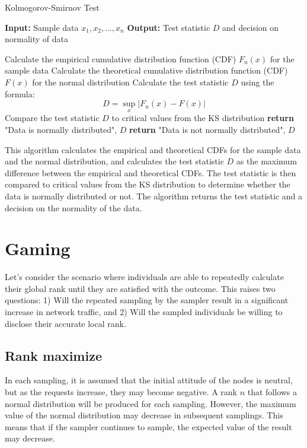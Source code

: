 \documentclass[twocolumn]{article}
\begin{document}
\begin{algorithm}[htbp]
\caption{Kolmogorov-Smirnov Test}
\begin{algorithmic}[1]
\State \textbf{Input:} Sample data $x_1, x_2, \dots, x_n$
\State \textbf{Output:} Test statistic $D$ and decision on normality of data

\State Calculate the empirical cumulative distribution function (CDF) $F_{n}(x)$ for the sample data
\State Calculate the theoretical cumulative distribution function (CDF) $F(x)$ for the normal distribution
\State Calculate the test statistic $D$ using the formula:
\begin{equation}
D = \sup_{x} \left| F_{n}(x) - F(x) \right|
\end{equation}
\State Compare the test statistic $D$ to critical values from the KS distribution
\State \textbf{return} "Data is normally distributed", $D$
\Else
\State \textbf{return} "Data is not normally distributed", $D$
\EndIf
\end{algorithmic}
\end{algorithm}

This algorithm calculates the empirical and theoretical CDFs for the sample data and the normal distribution, and calculates the test statistic $D$ as the maximum difference between the empirical and theoretical CDFs. The test statistic is then compared to critical values from the KS distribution to determine whether the data is normally distributed or not. The algorithm returns the test statistic and a decision on the normality of the data.


\section{Gaming}
Let's consider the scenario where individuals are able to repeatedly calculate their global rank until they are satisfied with the outcome. This raises two questions: 1) Will the repeated sampling by the sampler result in a significant increase in network traffic, and 2) Will the sampled individuals be willing to disclose their accurate local rank.
\subsection{Rank maximize}

In each sampling, it is assumed that the initial attitude of the nodes is neutral, but as the requests increase, they may become negative. A rank $n$ that follows a normal distribution will be produced for each sampling. However, the maximum value of the normal distribution may decrease in subsequent samplings. This means that if the sampler continues to sample, the expected value of the result may decrease.
\end{document}
